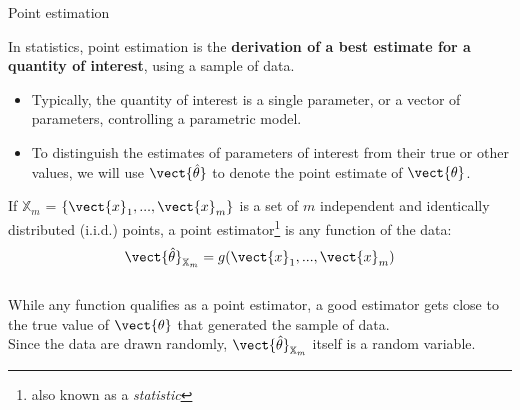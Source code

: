
\begin{frame}[t]{Point estimation}

    In statistics, 
    \gls{point estimation}
    is the {\bf derivation of a best estimate
    for a quantity of interest}, using a sample of data.
    \begin{itemize}
        \small
        \item
        Typically, the quantity of interest is a 
        single parameter, or a vector of parameters, 
        controlling a parametric model.
        \item
        To distinguish the estimates of parameters of
        interest from their true or other values,
        we will use $\vect{\hat{\theta}}$ to denote the 
        point estimate of $\vect{\theta}$.
    \end{itemize}

    \vspace{0.2cm}

    If $\mathbb{X}_{m}$ = $\{\vect{x}_{1}, ..., \vect{x}_{m}\}$ is a set
    of $m$ independent and identically distributed (i.i.d.) points,
    a \gls{point estimator}\footnote{
        also known as a {\em statistic}} 
    is any function of the data:\\
    \vspace{-0.1cm}
    \begin{equation}
        \vect{\hat{\theta}}_{\mathbb{X}_{m}} = g(\vect{x}_{1}, ..., \vect{x}_{m})
        \label{eq:point_estimator}
    \end{equation}\\

    \vspace{0.2cm}
    While any function qualifies as a \gls{point estimator}, 
    a good estimator gets close to the true value of $\vect{\theta}$
    that generated the sample of data.\\

    \vspace{0.2cm}
    Since the data are drawn randomly, 
    $\vect{\hat{\theta}}_{\mathbb{X}_{m}}$ itself is a random variable.\\

\end{frame}